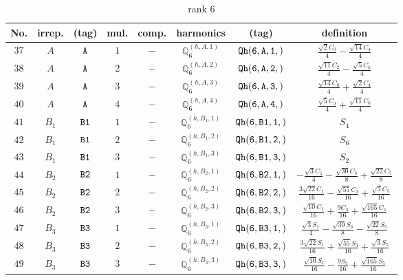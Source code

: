 \documentclass[fleqn,8pt]{jsarticle}
\begin{document}
\begin{table}[ht!]
\begin{center}
\caption{rank 6}
\renewcommand{\arraystretch}{1.3}
\begin{tabular}{cccccccc} \hline \hline
No. & irrep. & (tag) & mul. & comp. & harmonics & (tag) & definition \\ \hline
$ 37 $ & $ A $ & $ {\tt A} $ & $ 1 $ & $ - $ & $ \mathbb{Q}_{6}^{(h,A,1)} $ & $ {\tt Qh(6,A,1,)} $ & $ \frac{\sqrt{2} C_{0}}{4} - \frac{\sqrt{14} C_{4}}{4} $ \\
$ 38 $ & $ A $ & $ {\tt A} $ & $ 2 $ & $ - $ & $ \mathbb{Q}_{6}^{(h,A,2)} $ & $ {\tt Qh(6,A,2,)} $ & $ \frac{\sqrt{11} C_{2}}{4} - \frac{\sqrt{5} C_{6}}{4} $ \\
$ 39 $ & $ A $ & $ {\tt A} $ & $ 3 $ & $ - $ & $ \mathbb{Q}_{6}^{(h,A,3)} $ & $ {\tt Qh(6,A,3,)} $ & $ \frac{\sqrt{14} C_{0}}{4} + \frac{\sqrt{2} C_{4}}{4} $ \\
$ 40 $ & $ A $ & $ {\tt A} $ & $ 4 $ & $ - $ & $ \mathbb{Q}_{6}^{(h,A,4)} $ & $ {\tt Qh(6,A,4,)} $ & $ \frac{\sqrt{5} C_{2}}{4} + \frac{\sqrt{11} C_{6}}{4} $ \\
$ 41 $ & $ B_{1} $ & $ {\tt B1} $ & $ 1 $ & $ - $ & $ \mathbb{Q}_{6}^{(h,B_{1},1)} $ & $ {\tt Qh(6,B1,1,)} $ & $ S_{4} $ \\
$ 42 $ & $ B_{1} $ & $ {\tt B1} $ & $ 2 $ & $ - $ & $ \mathbb{Q}_{6}^{(h,B_{1},2)} $ & $ {\tt Qh(6,B1,2,)} $ & $ S_{6} $ \\
$ 43 $ & $ B_{1} $ & $ {\tt B1} $ & $ 3 $ & $ - $ & $ \mathbb{Q}_{6}^{(h,B_{1},3)} $ & $ {\tt Qh(6,B1,3,)} $ & $ S_{2} $ \\
$ 44 $ & $ B_{2} $ & $ {\tt B2} $ & $ 1 $ & $ - $ & $ \mathbb{Q}_{6}^{(h,B_{2},1)} $ & $ {\tt Qh(6,B2,1,)} $ & $ - \frac{\sqrt{3} C_{1}}{4} - \frac{\sqrt{30} C_{3}}{8} + \frac{\sqrt{22} C_{5}}{8} $ \\
$ 45 $ & $ B_{2} $ & $ {\tt B2} $ & $ 2 $ & $ - $ & $ \mathbb{Q}_{6}^{(h,B_{2},2)} $ & $ {\tt Qh(6,B2,2,)} $ & $ \frac{3 \sqrt{22} C_{1}}{16} - \frac{\sqrt{55} C_{3}}{16} + \frac{\sqrt{3} C_{5}}{16} $ \\
$ 46 $ & $ B_{2} $ & $ {\tt B2} $ & $ 3 $ & $ - $ & $ \mathbb{Q}_{6}^{(h,B_{2},3)} $ & $ {\tt Qh(6,B2,3,)} $ & $ \frac{\sqrt{10} C_{1}}{16} + \frac{9 C_{3}}{16} + \frac{\sqrt{165} C_{5}}{16} $ \\
$ 47 $ & $ B_{3} $ & $ {\tt B3} $ & $ 1 $ & $ - $ & $ \mathbb{Q}_{6}^{(h,B_{3},1)} $ & $ {\tt Qh(6,B3,1,)} $ & $ \frac{\sqrt{3} S_{1}}{4} - \frac{\sqrt{30} S_{3}}{8} - \frac{\sqrt{22} S_{5}}{8} $ \\
$ 48 $ & $ B_{3} $ & $ {\tt B3} $ & $ 2 $ & $ - $ & $ \mathbb{Q}_{6}^{(h,B_{3},2)} $ & $ {\tt Qh(6,B3,2,)} $ & $ \frac{3 \sqrt{22} S_{1}}{16} + \frac{\sqrt{55} S_{3}}{16} + \frac{\sqrt{3} S_{5}}{16} $ \\
$ 49 $ & $ B_{3} $ & $ {\tt B3} $ & $ 3 $ & $ - $ & $ \mathbb{Q}_{6}^{(h,B_{3},3)} $ & $ {\tt Qh(6,B3,3,)} $ & $ \frac{\sqrt{10} S_{1}}{16} - \frac{9 S_{3}}{16} + \frac{\sqrt{165} S_{5}}{16} $ \\
 \hline \hline
\end{tabular}
\end{center}
\end{table}
\end{document}
